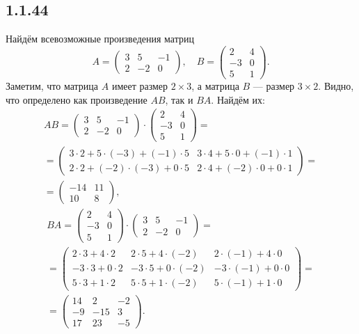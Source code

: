 \subsection{1.1.44}

Найдём всевозможные произведения матриц
\[
A=
\begin{pmatrix}
	3 & 5 & -1 \\
	2 & -2 & 0
\end{pmatrix}
,\quad B=
\begin{pmatrix}
	2 & 4 \\
	-3 & 0 \\
	5 & 1
\end{pmatrix}
.
\]
Заметим, что матрица $A$ имеет размер $2\times 3$, а матрица $B$ --- размер $3\times 2$. Видно, что определено как произведение $AB$, так и $BA$. Найдём их:
\begin{multline*}
AB=
\begin{pmatrix}
	3 & 5 & -1 \\
	2 & -2 & 0
\end{pmatrix}
\cdot
\begin{pmatrix}
	2 & 4 \\
	-3 & 0 \\
	5 & 1
\end{pmatrix}
= \\
=
\begin{pmatrix}
	3\cdot2+5\cdot(-3)+(-1)\cdot5 & 3\cdot4+5\cdot0+(-1)\cdot1 \\
	2\cdot2+(-2)\cdot(-3)+0\cdot5 & 2\cdot4+(-2)\cdot0+0\cdot1
\end{pmatrix}
= \\
=
\begin{pmatrix}
	-14 & 11 \\
	10 & 8
\end{pmatrix}
,
\end{multline*}
\begin{multline*}
BA=
\begin{pmatrix}
	2 & 4 \\
	-3 & 0 \\
	5 & 1
\end{pmatrix}
\cdot
\begin{pmatrix}
	3 & 5 & -1 \\
	2 & -2 & 0
\end{pmatrix}
= \\
=
\begin{pmatrix}
	2\cdot3+4\cdot2 & 2\cdot5+4\cdot(-2) & 2\cdot(-1)+4\cdot0 \\
	-3\cdot3+0\cdot2 & -3\cdot5+0\cdot(-2) & -3\cdot(-1)+0\cdot0 \\
	5\cdot3+1\cdot2 & 5\cdot5+1\cdot(-2) & 5\cdot(-1)+1\cdot0
\end{pmatrix}
= \\
=
\begin{pmatrix}
	14 & 2 & -2 \\
	-9 & -15 & 3 \\
	17 & 23 & -5
\end{pmatrix}
.
\end{multline*}